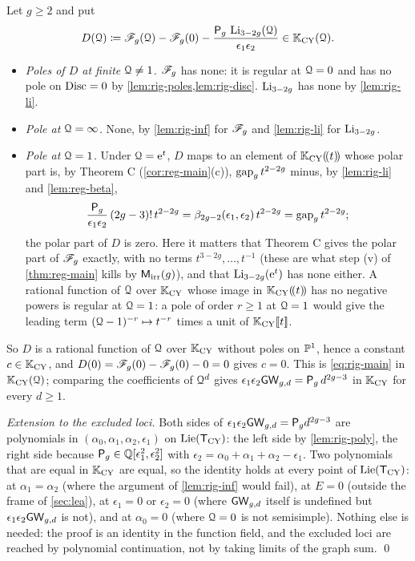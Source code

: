 Let $g\geq 2$ and put
\[
D(\mathcal{Q})\coloneqq\mathscr{F}_g(\mathcal{Q})-\mathscr{F}_g(0)-\frac{\mathsf{P}_{g}\,\operatorname{Li}_{3-2g}(\mathcal{Q})}{\epsilon_1\epsilon_2}\in\mathbb{K}_{\mathrm{CY}}(\mathcal{Q}).
\]
\begin{itemize}
\item \emph{Poles of $D$ at finite $\mathcal{Q}\neq 1$.} $\mathscr{F}_g$ has none: it is regular at $\mathcal{Q}=0$ and has no pole on $\operatorname{Disc}=0$ by \cref{lem:rig-poles,lem:rig-disc}. $\operatorname{Li}_{3-2g}$ has none by \cref{lem:rig-li}.
\item \emph{Pole at $\mathcal{Q}=\infty$.} None, by \cref{lem:rig-inf} for $\mathscr{F}_g$ and \cref{lem:rig-li} for $\operatorname{Li}_{3-2g}$.
\item \emph{Pole at $\mathcal{Q}=1$.} Under $\mathcal{Q}=\mathrm{e}^t$, $D$ maps to an element of $\mathbb{K}_{\mathrm{CY}}(\!(t)\!)$ whose polar part is, by Theorem C (\cref{cor:reg-main}(c)), $\mathrm{gap}_g\,t^{2-2g}$ minus, by \cref{lem:rig-li} and \cref{lem:reg-beta},
\[
\frac{\mathsf{P}_{g}}{\epsilon_1\epsilon_2}\,(2g-3)!\,t^{2-2g}=\beta_{2g-2}(\epsilon_1,\epsilon_2)\,t^{2-2g}=\mathrm{gap}_g\,t^{2-2g};
\]
the polar part of $D$ is zero. Here it matters that Theorem C gives the polar part of $\mathscr{F}_g$ exactly, with no terms $t^{3-2g},\dots,t^{-1}$ (these are what step (v) of \cref{thm:reg-main} kills by $\mathsf{M}_{\mathrm{irr}}(g)$), and that $\operatorname{Li}_{3-2g}(\mathrm{e}^t)$ has none either. A rational function of $\mathcal{Q}$ over $\mathbb{K}_{\mathrm{CY}}$ whose image in $\mathbb{K}_{\mathrm{CY}}(\!(t)\!)$ has no negative powers is regular at $\mathcal{Q}=1$: a pole of order $r\geq 1$ at $\mathcal{Q}=1$ would give the leading term $(\mathcal{Q}-1)^{-r}\mapsto t^{-r}$ times a unit of $\mathbb{K}_{\mathrm{CY}}[\![ t ]\!]$.
\end{itemize}
So $D$ is a rational function of $\mathcal{Q}$ over $\mathbb{K}_{\mathrm{CY}}$ without poles on $\mathbb{P}^1$, hence a constant $c\in\mathbb{K}_{\mathrm{CY}}$, and $D(0)=\mathscr{F}_g(0)-\mathscr{F}_g(0)-0=0$ gives $c=0$. This is \eqref{eq:rig-main} in $\mathbb{K}_{\mathrm{CY}}(\mathcal{Q})$; comparing the coefficients of $\mathcal{Q}^d$ gives $\epsilon_1\epsilon_2\mathsf{GW}_{g,d}=\mathsf{P}_{g}\,d^{2g-3}$ in $\mathbb{K}_{\mathrm{CY}}$ for every $d\geq 1$.

\emph{Extension to the excluded loci.} Both sides of $\epsilon_1\epsilon_2\mathsf{GW}_{g,d}=\mathsf{P}_{g} d^{2g-3}$ are polynomials in $(\alpha_0,\alpha_1,\alpha_2,\epsilon_1)$ on $\mathrm{Lie}(\mathsf{T}_{\mathrm{CY}})$: the left side by \cref{lem:rig-poly}, the right side because $\mathsf{P}_{g}\in\mathbb{Q}[\epsilon_1^2,\epsilon_2^2]$ with $\epsilon_2=\alpha_0+\alpha_1+\alpha_2-\epsilon_1$. Two polynomials that are equal in $\mathbb{K}_{\mathrm{CY}}$ are equal, so the identity holds at every point of $\mathrm{Lie}(\mathsf{T}_{\mathrm{CY}})$: at $\alpha_1=\alpha_2$ (where the argument of \cref{lem:rig-inf} would fail), at $E=0$ (outside the frame of \cref{sec:lea}), at $\epsilon_1=0$ or $\epsilon_2=0$ (where $\mathsf{GW}_{g,d}$ itself is undefined but $\epsilon_1\epsilon_2\mathsf{GW}_{g,d}$ is not), and at $\alpha_0=0$ (where $\mathcal{Q}=0$ is not semisimple). Nothing else is needed: the proof is an identity in the function field, and the excluded loci are reached by polynomial continuation, not by taking limits of the graph sum. \qed

